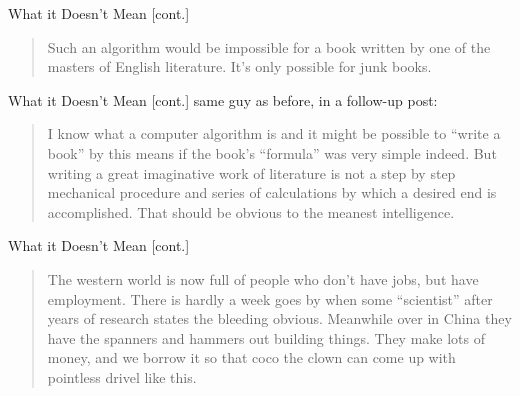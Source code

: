 \documentclass[professionalfonts, xcolor={usenames,svgnames,x11names,table}]{beamer}
\begin{document}
\begin{frame}{What it Doesn't Mean [cont.]}
    \begin{quote}
        Such an algorithm would be impossible for a book written by one of the masters of English literature. It's only possible for junk books.
    \end{quote}

\end{frame}

\begin{frame}{What it Doesn't Mean [cont.]}
    same guy as before, in a follow-up post:

    \begin{quote}
        I know what a computer algorithm is and it might be possible to ``write a book'' by this means if the book's ``formula'' was very simple indeed. But writing a great imaginative work of literature is not a step by step mechanical procedure and series of calculations by which a desired end is accomplished. That should be obvious to the meanest intelligence.
    \end{quote}

\end{frame}

\begin{frame}{What it Doesn't Mean [cont.]}
    \begin{quote}
        The western world is now full of people who don't have jobs, but have employment. There is hardly a week goes by when some ``scientist'' after years of research states the bleeding obvious. 
        Meanwhile over in China they have the spanners and hammers out building things.
        They make lots of money, and we borrow it so that coco the clown can come up with pointless drivel like this.
    \end{quote}

\end{frame}
\end{document}
